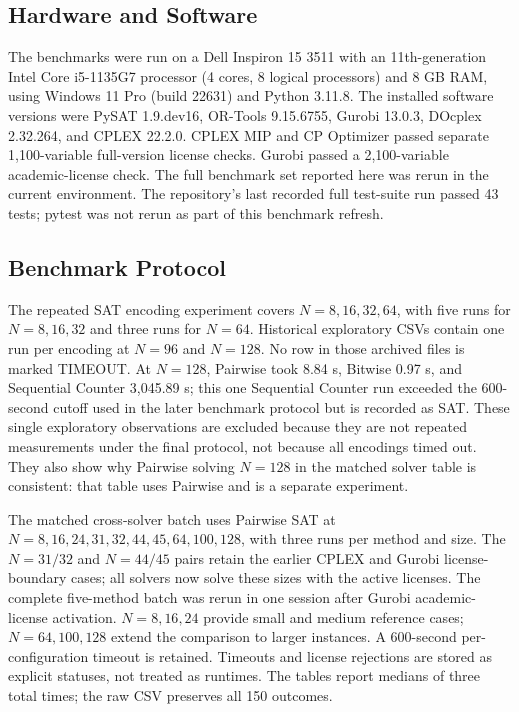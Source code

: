 \documentclass[a4paper,fleqn]{cas-sc}
\begin{document}
\subsection{Hardware and Software}

The benchmarks were run on a Dell Inspiron 15 3511 with an 11th-generation Intel Core i5-1135G7 processor (4 cores, 8 logical processors) and 8 GB RAM, using Windows 11 Pro (build 22631) and Python 3.11.8. The installed software versions were PySAT 1.9.dev16, OR-Tools 9.15.6755, Gurobi 13.0.3, DOcplex 2.32.264, and CPLEX 22.2.0. CPLEX MIP and CP Optimizer passed separate 1,100-variable full-version license checks. Gurobi passed a 2,100-variable academic-license check. The full benchmark set reported here was rerun in the current environment. The repository's last recorded full test-suite run passed 43 tests; pytest was not rerun as part of this benchmark refresh.

\subsection{Benchmark Protocol}

The repeated SAT encoding experiment covers $N=8,16,32,64$, with five runs for $N=8,16,32$ and three runs for $N=64$. Historical exploratory CSVs contain one run per encoding at $N=96$ and $N=128$. No row in those archived files is marked TIMEOUT. At $N=128$, Pairwise took 8.84 s, Bitwise 0.97 s, and Sequential Counter 3,045.89 s; this one Sequential Counter run exceeded the 600-second cutoff used in the later benchmark protocol but is recorded as SAT. These single exploratory observations are excluded because they are not repeated measurements under the final protocol, not because all encodings timed out. They also show why Pairwise solving $N=128$ in the matched solver table is consistent: that table uses Pairwise and is a separate experiment.

The matched cross-solver batch uses Pairwise SAT at $N=8,16,24,31,32,44,45,64,100,128$, with three runs per method and size. The $N=31/32$ and $N=44/45$ pairs retain the earlier CPLEX and Gurobi license-boundary cases; all solvers now solve these sizes with the active licenses. The complete five-method batch was rerun in one session after Gurobi academic-license activation. $N=8,16,24$ provide small and medium reference cases; $N=64,100,128$ extend the comparison to larger instances. A 600-second per-configuration timeout is retained. Timeouts and license rejections are stored as explicit statuses, not treated as runtimes. The tables report medians of three total times; the raw CSV preserves all 150 outcomes.
\end{document}
